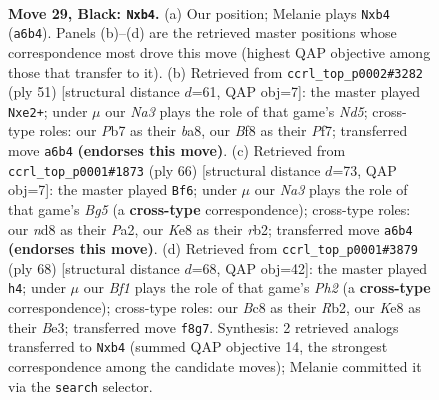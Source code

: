 \documentclass[11pt]{article}
\begin{document}
\clearpage

\begin{figure}[p]\centering
\begin{subfigure}{0.46\textwidth}\centering
\resizebox{\linewidth}{!}{%
\newchessgame
\chessboard[
  setfen={r1bNkbn1/ppp1p3/n7/P1P5/1P3P2/3R4/8/RNB1K3 b Q - 0 29},
  showmover=false,
  pgfstyle=straightmove, color=movearrow, markmove={a6-b4}
]}
\caption{}
\end{subfigure}\hfill
\begin{subfigure}{0.46\textwidth}\centering
\resizebox{\linewidth}{!}{%
\newchessgame
\chessboard[
  setfen={B5k1/p4ppp/4p3/R1N1P3/3n4/1b4P1/1r2PP1P/2R3K1 b - - 0 26},
  showmover=false,
  pgfstyle=straightmove, color=movearrow, markmove={d4-e2}
]}
\caption{}
\end{subfigure}
\\[4pt]
\begin{subfigure}{0.46\textwidth}\centering
\resizebox{\linewidth}{!}{%
\newchessgame
\chessboard[
  setfen={6k1/5p2/4p1p1/4P1B1/p3p2P/2Nn2K1/Prb2PP1/R7 w - - 3 34},
  showmover=false,
  pgfstyle=straightmove, color=movearrow, markmove={g5-f6}
]}
\caption{}
\end{subfigure}\hfill
\begin{subfigure}{0.46\textwidth}\centering
\resizebox{\linewidth}{!}{%
\newchessgame
\chessboard[
  setfen={3b4/5kp1/1p6/p1nr1p1p/P1N5/1P2B1P1/1R3PKP/8 w - - 2 35},
  showmover=false,
  pgfstyle=straightmove, color=movearrow, markmove={h2-h4}
]}
\caption{}
\end{subfigure}
\caption{\textbf{Move 29, Black: \texttt{Nxb4}.} (a) Our position; Melanie plays \texttt{Nxb4} (\texttt{a6b4}). Panels (b)--(d) are the retrieved master positions whose correspondence most drove this move (highest QAP objective among those that transfer to it). (b) Retrieved from \texttt{ccrl\_top\_p0002\#3282} (ply 51) [structural distance $d$=61, QAP obj=7]: the master played \texttt{Nxe2+}; under $\mu$ our \emph{Na3} plays the role of that game's \emph{Nd5}; cross-type roles: our \emph{P}b7 as their \emph{b}a8, our \emph{B}f8 as their \emph{P}f7; transferred move \texttt{a6b4} \textbf{(endorses this move)}. (c) Retrieved from \texttt{ccrl\_top\_p0001\#1873} (ply 66) [structural distance $d$=73, QAP obj=7]: the master played \texttt{Bf6}; under $\mu$ our \emph{Na3} plays the role of that game's \emph{Bg5} (a \textbf{cross-type} correspondence); cross-type roles: our \emph{n}d8 as their \emph{P}a2, our \emph{K}e8 as their \emph{r}b2; transferred move \texttt{a6b4} \textbf{(endorses this move)}. (d) Retrieved from \texttt{ccrl\_top\_p0001\#3879} (ply 68) [structural distance $d$=68, QAP obj=42]: the master played \texttt{h4}; under $\mu$ our \emph{Bf1} plays the role of that game's \emph{Ph2} (a \textbf{cross-type} correspondence); cross-type roles: our \emph{B}c8 as their \emph{R}b2, our \emph{K}e8 as their \emph{B}e3; transferred move \texttt{f8g7}. Synthesis: 2 retrieved analogs transferred to \texttt{Nxb4} (summed QAP objective 14, the strongest correspondence among the candidate moves); Melanie committed it via the \texttt{search} selector.}
\label{fig:thought-m57}
\end{figure}
\end{document}
